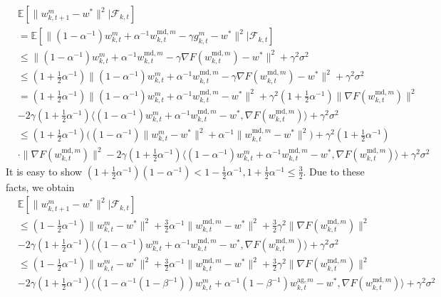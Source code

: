 \documentclass[11pt]{article}
\begin{document}
\begin{align*}
    &\mathbb{E}[\|w_{k, t+1}^m-w^*\|^2|\mathcal{F}_{k, t}] \\
    &= \mathbb{E}[\|(1-\alpha^{-1})w_{k, t}^m + \alpha^{-1}w_{k, t}^{\textrm{md}, m} - \gamma g_{k, t}^m -w^*\|^2|\mathcal{F}_{k, t}] \\
    &\leq \|(1-\alpha^{-1})w_{k, t}^m + \alpha^{-1}w_{k, t}^{\textrm{md}, m} - \gamma\nabla F(w_{k, t}^{\textrm{md}, m}) -w^*\|^2 +\gamma^2\sigma^2 \\
    &\leq (1+\frac{1}{2}\alpha^{-1})\|(1-\alpha^{-1})w_{k, t}^m + \alpha^{-1}w_{k, t}^{\textrm{md}, m} - \gamma\nabla F(w_{k, t}^{\textrm{md}, m}) -w^*\|^2 +\gamma^2\sigma^2 \\
    &= (1+\frac{1}{2}\alpha^{-1})\|(1-\alpha^{-1})w_{k, t}^m + \alpha^{-1}w_{k, t}^{\textrm{md}, m} - w^*\|^2 + \gamma^2(1+\frac{1}{2}\alpha^{-1}) \|\nabla F(w_{k, t}^{\textrm{md}, m})\|^2 \\
    &- 2\gamma(1+\frac{1}{2}\alpha^{-1}) \langle (1-\alpha^{-1})w_{k, t}^m + \alpha^{-1}w_{k, t}^{\textrm{md}, m} - w^*, \nabla F(w_{k, t}^{\textrm{md}, m})\rangle + \gamma^2\sigma^2 \\
    &\leq (1+\frac{1}{2}\alpha^{-1})\Big((1-\alpha^{-1})\|w_{k, t}^m - w^*\|^2 + \alpha^{-1}\|w_{k, t}^{\textrm{md}, m} - w^*\|^2\Big) + \gamma^2(1+\frac{1}{2}\alpha^{-1}) \\
    &\cdot \|\nabla F(w_{k, t}^{\textrm{md}, m})\|^2  - 2\gamma(1+\frac{1}{2}\alpha^{-1}) \langle (1-\alpha^{-1})w_{k, t}^m + \alpha^{-1}w_{k, t}^{\textrm{md}, m} - w^*, \nabla F(w_{k, t}^{\textrm{md}, m})\rangle + \gamma^2\sigma^2
\end{align*}
It is easy to show $(1+\frac{1}{2}\alpha^{-1})(1-\alpha^{-1}) < 1-\frac{1}{2}\alpha^{-1}, 1+\frac{1}{2}\alpha^{-1} \leq \frac{3}{2}$. Due to these facts, we obtain
\begin{align*}
    &\mathbb{E}[\|w_{k, t+1}^m-w^*\|^2|\mathcal{F}_{k, t}] \\
    &\leq (1-\frac{1}{2}\alpha^{-1})\|w_{k, t}^m - w^*\|^2 + \frac{3}{2}\alpha^{-1}\|w_{k, t}^{\textrm{md}, m} - w^*\|^2 + \frac{3}{2}\gamma^2 \|\nabla F(w_{k, t}^{\textrm{md}, m})\|^2 \\
    &- 2\gamma(1+\frac{1}{2}\alpha^{-1}) \langle (1-\alpha^{-1})w_{k, t}^m + \alpha^{-1}w_{k, t}^{\textrm{md}, m} - w^*, \nabla F(w_{k, t}^{\textrm{md}, m})\rangle + \gamma^2\sigma^2 \\
    &\leq (1-\frac{1}{2}\alpha^{-1})\|w_{k, t}^m - w^*\|^2 + \frac{3}{2}\alpha^{-1}\|w_{k, t}^{\textrm{md}, m} - w^*\|^2 + \frac{3}{2}\gamma^2 \|\nabla F(w_{k, t}^{\textrm{md}, m})\|^2 \\
    &- 2\gamma(1+\frac{1}{2}\alpha^{-1}) \langle (1-\alpha^{-1}(1-\beta^{-1}))w_{k, t}^m + \alpha^{-1}(1-\beta^{-1})w_{k, t}^{\textrm{ag}, m} - w^*, \nabla F(w_{k, t}^{\textrm{md}, m})\rangle + \gamma^2\sigma^2
\end{align*}
\end{document}
